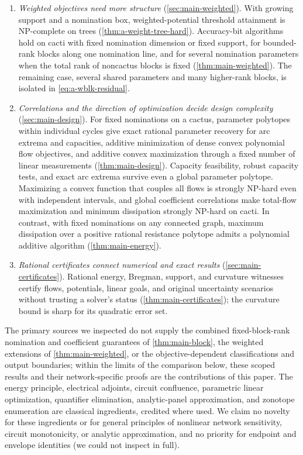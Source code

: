\begin{enumerate}
\item \emph{Weighted objectives need more structure}
(\cref{sec:main-weighted}). With growing support and a nomination box,
weighted-potential threshold attainment is NP-complete on trees
(\cref{thm:a-weight-tree-hard}). Accuracy-bit algorithms hold on cacti
with fixed nomination dimension or fixed support, for bounded-rank blocks
along one nomination line, and for several nomination parameters when the
total rank of noncactus blocks is fixed (\cref{thm:main-weighted}). The
remaining case, several shared parameters and many higher-rank blocks,
is isolated in \cref{eq:a-wblk-residual}.

\item \emph{Correlations and the direction of optimization decide design
complexity} (\cref{sec:main-design}). For fixed nominations on a cactus, parameter
polytopes within individual cycles give exact rational parameter
recovery for arc extrema and capacities, additive minimization of dense
convex polynomial flow objectives, and additive convex maximization
through a fixed number of linear measurements (\cref{thm:main-design}).
Capacity feasibility, robust capacity tests, and exact arc extrema
survive even a global parameter polytope. Maximizing a convex function
that couples all flows is strongly NP-hard even with independent
intervals, and global coefficient correlations make total-flow maximization and minimum
dissipation strongly NP-hard on cacti. In contrast, with fixed
nominations on any connected graph, maximum dissipation over a positive
rational resistance polytope admits a polynomial additive algorithm
(\cref{thm:main-energy}).

\item \emph{Rational certificates connect numerical and exact results}
(\cref{sec:main-certificates}). Rational energy, Bregman, support, and
curvature witnesses certify flows, potentials, linear goals, and
original uncertainty scenarios without trusting a solver's status
(\cref{thm:main-certificates}); the curvature bound is sharp for its
quadratic error set.
\end{enumerate}

The primary sources we inspected do not supply the combined
fixed-block-rank nomination and coefficient guarantees of
\cref{thm:main-block}, the weighted extensions of
\cref{thm:main-weighted}, or the objective-dependent classifications and
output boundaries; within the limits of the comparison below, these
scoped results and their network-specific proofs are the contributions
of this paper. The energy principle, electrical adjoints, circuit
confluence, parametric linear optimization, quantifier elimination,
analytic-panel approximation, and zonotope enumeration are classical
ingredients, credited where used. We claim no novelty for these
ingredients or for general principles of nonlinear network sensitivity,
circuit monotonicity, or analytic approximation, and no priority for
endpoint and envelope identities (we could not inspect
\citet{hasler1993-parameter-tolerances} in full).

